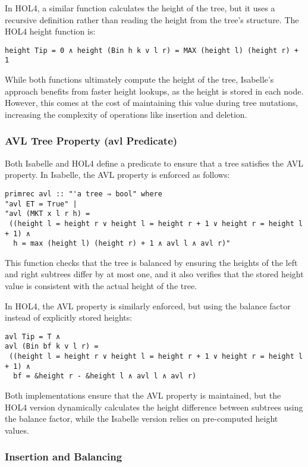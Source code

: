 \documentclass[12pt]{article}
\begin{document}
In HOL4, a similar function calculates the height of the tree, but it uses a recursive definition rather than reading the height from the tree’s structure. The HOL4 height function is:

\begin{verbatim}
height Tip = 0 ∧ height (Bin h k v l r) = MAX (height l) (height r) + 1
\end{verbatim}

While both functions ultimately compute the height of the tree, Isabelle’s approach benefits from faster height lookups, as the height is stored in each node. However, this comes at the cost of maintaining this value during tree mutations, increasing the complexity of operations like insertion and deletion.

\subsubsection{AVL Tree Property (avl Predicate)}
Both Isabelle and HOL4 define a predicate to ensure that a tree satisfies the AVL property. In Isabelle, the AVL property is enforced as follows:

\begin{verbatim}
primrec avl :: "'a tree ⇒ bool" where
"avl ET = True" |
"avl (MKT x l r h) =
 ((height l = height r ∨ height l = height r + 1 ∨ height r = height l + 1) ∧ 
  h = max (height l) (height r) + 1 ∧ avl l ∧ avl r)"
\end{verbatim}

This function checks that the tree is balanced by ensuring the heights of the left and right subtrees differ by at most one, and it also verifies that the stored height value is consistent with the actual height of the tree.

In HOL4, the AVL property is similarly enforced, but using the balance factor instead of explicitly stored heights:

\begin{verbatim}
avl Tip = T ∧
avl (Bin bf k v l r) =
 ((height l = height r ∨ height l = height r + 1 ∨ height r = height l + 1) ∧
  bf = &height r - &height l ∧ avl l ∧ avl r)
\end{verbatim}

Both implementations ensure that the AVL property is maintained, but the HOL4 version dynamically calculates the height difference between subtrees using the balance factor, while the Isabelle version relies on pre-computed height values.

\subsubsection{Insertion and Balancing}
\end{document}
